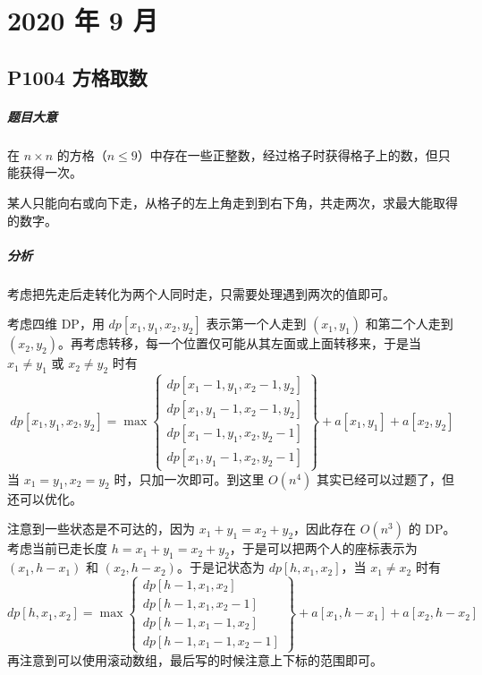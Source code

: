 \chapter{2020 年 9 月}

\section{P1004 方格取数}

\paragraph{题目大意}

在 $n \times n$ 的方格（$n \leqslant 9$）中存在一些正整数，经过格子时获得格子上的数，但只能获得一次。

某人只能向右或向下走，从格子的左上角走到到右下角，共走两次，求最大能取得的数字。

\paragraph{分析}

考虑把先走后走转化为两个人同时走，只需要处理遇到两次的值即可。

考虑四维 DP，用 $dp[x_1,y_1,x_2,y_2]$ 表示第一个人走到 $(x_1,y_1)$ 和第二个人走到 $(x_2,y_2)$。再考虑转移，每一个位置仅可能从其左面或上面转移来，于是当 $x_1 \ne y_1$ 或 $x_2 \ne y_2$ 时有
\[ dp[x_1,y_1,x_2,y_2] = \max\left\{ \begin{matrix}
dp[x_1-1,y_1,x_2-1,y_2] \\
dp[x_1,y_1-1,x_2-1,y_2] \\
dp[x_1-1,y_1,x_2,y_2-1] \\
dp[x_1,y_1-1,x_2,y_2-1]
\end{matrix}\right\}  + a[x_1,y_1] + a[x_2,y_2] \]
当 $x_1=y_1,x_2=y_2$ 时，只加一次即可。到这里 $O(n^4)$ 其实已经可以过题了，但还可以优化。

注意到一些状态是不可达的，因为 $x_1+y_1 = x_2+y_2$，因此存在 $O(n^3)$ 的 DP。考虑当前已走长度 $h=x_1+y_1=x_2+y_2$，于是可以把两个人的座标表示为 $(x_1,h-x_1)$ 和 $(x_2,h-x_2)$。于是记状态为 $dp[h,x_1,x_2]$，当 $x_1 \ne x_2$ 时有
\[ dp[h,x_1,x_2] = \max\left\{ \begin{matrix}
dp[h-1,x_1,x_2] \\
dp[h-1,x_1,x_2-1] \\
dp[h-1,x_1-1,x_2] \\
dp[h-1,x_1-1,x_2-1]
\end{matrix}\right\}  + a[x_1,h-x_1] + a[x_2,h-x_2] \]
再注意到可以使用滚动数组，最后写的时候注意上下标的范围即可。

